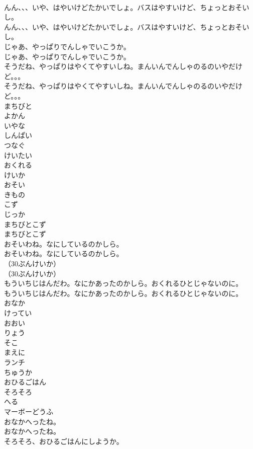 \documentclass[8pt]{extreport}
\begin{document}
\begin{CJK}{UTF8}{min}
\\	んん、、、いや、はやいけどたかいでしょ。バスはやすいけど、ちょっとおそいし。
\\	んん、、、いや、はやいけどたかいでしょ。バスはやすいけど、ちょっとおそいし。
\\	じゃあ、やっぱりでんしゃでいこうか。
\\	じゃあ、やっぱりでんしゃでいこうか。
\\	そうだね、やっぱりはやくてやすいしね。まんいんでんしゃのるのいやだけど。。。
\\	そうだね、やっぱりはやくてやすいしね。まんいんでんしゃのるのいやだけど。。。
\\	まちびと
\\	よかん
\\	いやな
\\	しんぱい
\\	つなぐ
\\	けいたい
\\	おくれる
\\	けいか
\\	おそい
\\	きもの
\\	こず
\\	じっか
\\	まちびとこず
\\	まちびとこず
\\	おそいわね。なにしているのかしら。
\\	おそいわね。なにしているのかしら。
\\	（30ぷんけいか）
\\	（30ぷんけいか）
\\	もういちじはんだわ。なにかあったのかしら。おくれるひとじゃないのに。
\\	もういちじはんだわ。なにかあったのかしら。おくれるひとじゃないのに。
\\	おなか
\\	けってい
\\	おおい
\\	りょう
\\	そこ
\\	まえに
\\	ランチ
\\	ちゅうか
\\	おひるごはん
\\	そろそろ
\\	へる
\\	マーボーどうふ
\\	おなかへったね。
\\	おなかへったね。
\\	そろそろ、おひるごはんにしようか。

\end{CJK}
\end{document}
